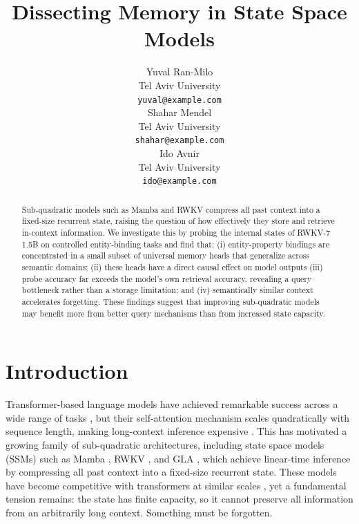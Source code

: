 \documentclass[11pt]{article}
\title{Dissecting Memory in State Space Models}
\author{
    Yuval Ran-Milo \\
    Tel Aviv University \\
    \texttt{yuval@example.com} \\\And
    Shahar Mendel \\
    Tel Aviv University \\
    \texttt{shahar@example.com} \\\And
    Ido Avnir \\
    Tel Aviv University \\
    \texttt{ido@example.com}
}
\begin{document}
\maketitle

\begin{abstract}
Sub-quadratic models such as Mamba and RWKV compress all past context into a fixed-size recurrent state, raising the question of how effectively they store and retrieve in-context information. We investigate this by probing the internal states of RWKV-7 1.5B on controlled entity-binding tasks and find that: (i) entity-property bindings are concentrated in a small subset of universal memory heads that generalize across semantic domains; (ii) these heads have a direct causal effect on model outputs (iii) probe accuracy far exceeds the model's own retrieval accuracy, revealing a query bottleneck rather than a storage limitation; and (iv) semantically similar context accelerates forgetting. These findings suggest that improving sub-quadratic models may benefit more from better query mechanisms than from increased state capacity.
\end{abstract}

\section{Introduction}
\label{sec:introduction}

Transformer-based language models have achieved remarkable success across a wide range of tasks \cite{brown2020fewshot}, but their self-attention mechanism scales quadratically with sequence length, making long-context inference expensive \cite{vaswani2017attention}. This has motivated a growing family of sub-quadratic architectures, including state space models (SSMs) such as Mamba \cite{gu2023mamba}, RWKV \cite{peng2023rwkv}, and GLA \cite{yang2023gla}, which achieve linear-time inference by compressing all past context into a fixed-size recurrent state. These models have become competitive with transformers at similar scales \cite{gu2023mamba,peng2025rwkv7}, yet a fundamental tension remains: the state has finite capacity, so it cannot preserve all information from an arbitrarily long context. Something must be forgotten.
\end{document}

